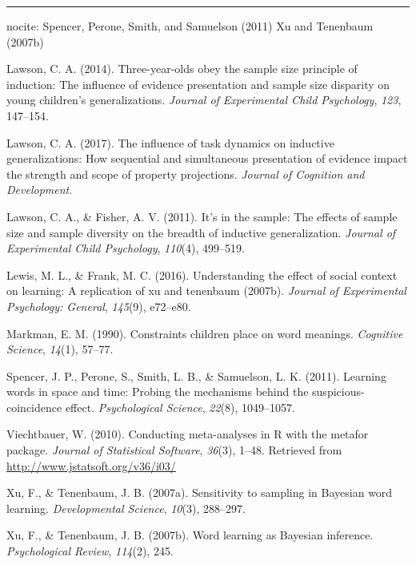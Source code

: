 \documentclass[english,floatsintext,man]{apa6}
\theoremstyle{definition}
\theoremstyle{definition}
\theoremstyle{remark}
\begin{document}
\begin{center}\rule{0.5\linewidth}{\linethickness}\end{center}

nocite: \textbar{} Spencer, Perone, Smith, and Samuelson (2011) Xu and
Tenenbaum (2007b)

\setlength{\parindent}{-0.5in} \setlength{\leftskip}{0.5in}

\hypertarget{refs}{}
\hypertarget{ref-lawson2014three}{}
Lawson, C. A. (2014). Three-year-olds obey the sample size principle of
induction: The influence of evidence presentation and sample size
disparity on young children's generalizations. \emph{Journal of
Experimental Child Psychology}, \emph{123}, 147--154.

\hypertarget{ref-lawson2017influence}{}
Lawson, C. A. (2017). The influence of task dynamics on inductive
generalizations: How sequential and simultaneous presentation of
evidence impact the strength and scope of property projections.
\emph{Journal of Cognition and Development}.

\hypertarget{ref-lawson2011s}{}
Lawson, C. A., \& Fisher, A. V. (2011). It's in the sample: The effects
of sample size and sample diversity on the breadth of inductive
generalization. \emph{Journal of Experimental Child Psychology},
\emph{110}(4), 499--519.

\hypertarget{ref-lewis2016understanding}{}
Lewis, M. L., \& Frank, M. C. (2016). Understanding the effect of social
context on learning: A replication of xu and tenenbaum (2007b).
\emph{Journal of Experimental Psychology: General}, \emph{145}(9),
e72--e80.

\hypertarget{ref-markman1990constraints}{}
Markman, E. M. (1990). Constraints children place on word meanings.
\emph{Cognitive Science}, \emph{14}(1), 57--77.

\hypertarget{ref-spencer2011learning}{}
Spencer, J. P., Perone, S., Smith, L. B., \& Samuelson, L. K. (2011).
Learning words in space and time: Probing the mechanisms behind the
suspicious-coincidence effect. \emph{Psychological Science},
\emph{22}(8), 1049--1057.

\hypertarget{ref-R-metafor}{}
Viechtbauer, W. (2010). Conducting meta-analyses in R with the metafor
package. \emph{Journal of Statistical Software}, \emph{36}(3), 1--48.
Retrieved from \url{http://www.jstatsoft.org/v36/i03/}

\hypertarget{ref-xu2007}{}
Xu, F., \& Tenenbaum, J. B. (2007a). Sensitivity to sampling in Bayesian
word learning. \emph{Developmental Science}, \emph{10}(3), 288--297.

\hypertarget{ref-xu2007word}{}
Xu, F., \& Tenenbaum, J. B. (2007b). Word learning as Bayesian
inference. \emph{Psychological Review}, \emph{114}(2), 245.
\end{document}
